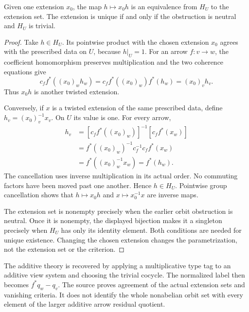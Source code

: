 \begin{KStheorem}\label{KS:KS32}
Given one extension \(x_0\), the map \(h\mapsto x_0h\) is an equivalence from \(H_U\) to the extension set. The extension is unique if and only if the obstruction is neutral and \(H_U\) is trivial.
\end{KStheorem}
\begin{proof}
Take \(h\in H_U\). Its pointwise product with the chosen extension \(x_0\) agrees with the prescribed data on \(U\), because \(h|_U=1\). For an arrow \(f:v\to w\), the coefficient homomorphism preserves multiplication and the two coherence equations give
\[
 c_f f^*((x_0)_wh_w)
 =c_f f^*((x_0)_w)f^*(h_w)
 =(x_0)_vh_v.
\]
Thus \(x_0h\) is another twisted extension.

Conversely, if \(x\) is a twisted extension of the same prescribed data, define \(h_v=(x_0)_v^{-1}x_v\). On \(U\) its value is one. For every arrow,
\[
 \begin{aligned}
 h_v
 &=[c_f f^*((x_0)_w)]^{-1}[c_f f^*(x_w)]\\
 &=f^*((x_0)_w)^{-1}c_f^{-1}c_f f^*(x_w)\\
 &=f^*((x_0)_w^{-1}x_w)=f^*(h_w).
 \end{aligned}
\]
The cancellation uses inverse multiplication in its actual order. No commuting factors have been moved past one another. Hence \(h\in H_U\). Pointwise group cancellation shows that \(h\mapsto x_0h\) and \(x\mapsto x_0^{-1}x\) are inverse maps.

The extension set is nonempty precisely when the earlier orbit obstruction is neutral. Once it is nonempty, the displayed bijection makes it a singleton precisely when \(H_U\) has only its identity element. Both conditions are needed for unique existence. Changing the chosen extension changes the parametrization, not the extension set or the criterion.
\end{proof}
The additive theory is recovered by applying a multiplicative type tag to an additive view system and choosing the trivial cocycle. The normalized label then becomes \(f^*q_w-q_v\). The source proves agreement of the actual extension sets and vanishing criteria. It does not identify the whole nonabelian orbit set with every element of the larger additive arrow residual quotient.

